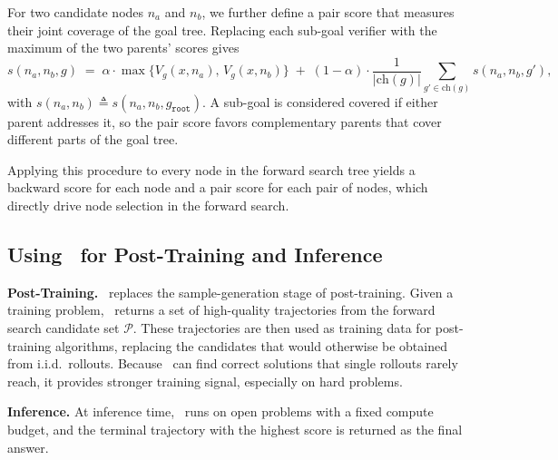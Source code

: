 For two candidate nodes $n_a$ and $n_b$, we further define a pair score that measures their joint coverage of the goal tree.
Replacing each sub-goal verifier with the maximum of the two
parents' scores gives
\begin{equation}
  s(n_a,n_b,g) \;=\; \alpha\cdot \max\{V_g(x,n_a),\, V_g(x,n_b)\}
    \;+\;(1-\alpha)\cdot\frac{1}{|\mathrm{ch}(g)|}
    \sum_{g'\in\mathrm{ch}(g)} s(n_a,n_b,g'),
  \label{eq:pair_score}
\end{equation}
with $s(n_a,n_b)\triangleq s(n_a,n_b,g_{\texttt{root}})$. A sub-goal is
considered covered if either parent addresses it, so the pair
score favors complementary parents that cover different parts
of the goal tree.

Applying this procedure to every node in the forward search
tree yields a backward score for each node and a pair
score for each pair of nodes, which directly drive node
selection in the forward search.

\subsection{Using \ours\ for Post-Training and Inference}
\label{sec:usage}

\textbf{Post-Training.}
\ours\ replaces the sample-generation stage of post-training. Given a training problem, \ours\ returns a set of high-quality trajectories from the forward search candidate set $\mathcal{P}$. These trajectories are then used as training data for post-training algorithms, replacing the candidates that would otherwise be obtained from i.i.d.\ rollouts.
Because \ours\ can find correct solutions that single rollouts
rarely reach, it provides stronger training signal, especially
on hard problems.

\textbf{Inference.}
At inference time, \ours\ runs on open problems with a
fixed compute budget, and the terminal trajectory with the
highest score is returned as the final answer. 